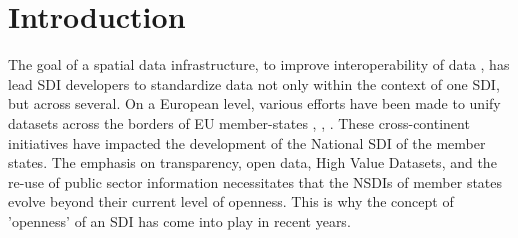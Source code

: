 
\section{Introduction}



%






% 
The goal of a spatial data infrastructure, to improve interoperability of data \citep{emergance_open_data_2018}, has lead SDI developers to standardize data not only within the context of one SDI, but across several. On a European level, various efforts have been made to unify datasets across the borders of EU member-states \citep{inspire_directive_2007}, \citep{psi_directive_law_2011}, \citep{open_data_directive_2019}. These cross-continent initiatives have impacted the development of the National SDI of the member states. The emphasis on transparency, open data, High Value Datasets, and the re-use of public sector information necessitates that the NSDIs of member states evolve beyond their current level of openness. This is why the concept of 'openness' of an SDI has come into play in recent years. 



